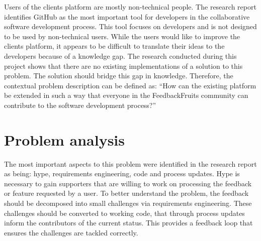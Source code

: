 Users of the clients platform are mostly non-technical people. The research report identifies GitHub as the most important tool for developers in the collaborative software development process. This tool focuses on developers and is not designed to be used by non-technical users. While the users would like to improve the clients platform, it appears to be difficult to translate their ideas to the developers because of a knowledge gap. The research conducted during this project shows that there are no existing implementations of a solution to this problem. The solution should bridge this gap in knowledge. Therefore, the contextual problem description can be defined as: ``How can the existing platform be extended in such a way that everyone in the FeedbackFruits community can contribute to the software development process?''

\section{Problem analysis}
The most important aspects to this problem were identified in the research report as being: hype, requirements engineering, code and process updates. Hype is necessary to gain supporters that are willing to work on processing the feedback or feature requested by a user. To better understand the problem, the feedback should be decomposed into small challenges via requirements engineering. These challenges should be converted to working code, that through process updates inform the contributors of the current status. This provides a feedback loop that ensures the challenges are tackled correctly.



